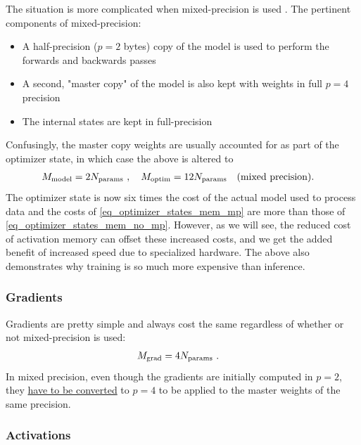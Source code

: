 \documentclass[11pt]{article}
\begin{document}
The situation is more complicated when mixed-precision is used \cite{micikevicius2018mixed}.
The pertinent components of mixed-precision:
\begin{itemize}
\item A half-precision ($ p=2 $ bytes) copy of the model is used to perform the forwards and
    backwards passes
\item A second, "master copy" of the model is also kept with weights in full $ p=4 $ precision
\item The internal  states are kept in full-precision
\end{itemize}
Confusingly, the master copy weights are usually accounted for as part of the optimizer state, in
which case the above is altered to
\begin{align}
    M _{ \rm model} &= 2 N _{ \rm params } \ , \quad M_{ \rm  optim } = 12 N _{ \rm params }
    \quad ({\rm mixed \ precision}) .
    \label{eq_optimizer_states_mem_mp}
\end{align}
The optimizer state is now six times the cost of the actual model used to process data and the costs
of \eqref{eq_optimizer_states_mem_mp} are more than those of \eqref{eq_optimizer_states_mem_no_mp}.
However, as we will see, the reduced cost of activation memory can offset these increased costs, and
we get the added benefit of increased speed due to specialized hardware. The above also demonstrates
why training is so much more expensive than inference.


\subsubsection{Gradients}

Gradients are pretty simple and always cost the same regardless of whether or not mixed-precision is
used:
\begin{align}
    M_{ \rm grad} &= 4 N _{ \rm params }     \label{eq_grad_memory} \ .
\end{align}
In mixed precision, even though the gradients are initially computed in $ p= 2$, they
\href{https://huggingface.co/docs/transformers/v4.20.1/en/perf_train_gpu_one#anatomy-of-models-memory}{have to
be converted} to $ p=4 $ to be applied to the master weights of the same precision.




\subsubsection{Activations}
\end{document}
